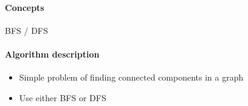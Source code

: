 \documentclass[11pt]{book}
\begin{document}
\paragraph{Concepts}
BFS / DFS
\paragraph{Algorithm description}
\begin{itemize}
    \item Simple problem of finding connected components in a graph
    \item Use either BFS or DFS
\end{itemize}


\end{document}
